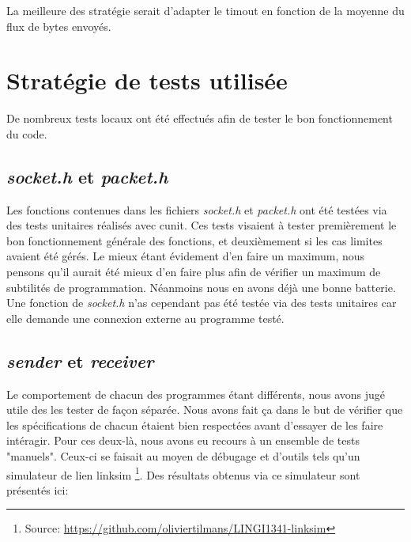 \documentclass[11pt,a4paper]{article}
\begin{document}
\vspace{3mm}

La meilleure des stratégie serait d'adapter le timout en fonction de la moyenne du flux de bytes envoyés.

\section{Stratégie de tests utilisée}
De nombreux tests locaux ont été effectués afin de tester le bon fonctionnement du code.

\subsection{\textit{socket.h} et \textit{packet.h}} Les fonctions contenues dans les fichiers \textit{socket.h} et \textit{packet.h} ont été testées via des tests unitaires réalisés avec cunit. Ces tests visaient à tester premièrement le bon fonctionnement générale des fonctions, et deuxièmement si les cas limites avaient été gérés. Le mieux étant évidement d'en faire un maximum, nous pensons qu'il aurait été mieux d'en faire plus afin de vérifier un maximum de subtilités de programmation. Néanmoins nous en avons déjà une bonne batterie. Une fonction de \textit{socket.h} n'as cependant pas été testée via des tests unitaires car elle demande une connexion externe au programme testé.

\subsection{\textit{sender} et \textit{receiver}}

 Le comportement de chacun des programmes étant différents, nous avons jugé utile des les tester de façon séparée. Nous avons fait ça dans le but de vérifier que les spécifications de chacun étaient bien respectées avant d'essayer de les faire intéragir. Pour ces deux-là, nous avons eu recours à un ensemble de tests "manuels". Ceux-ci se faisait au moyen de débugage et d'outils tels qu'un simulateur de lien linksim \footnote{Source: \url{https://github.com/oliviertilmans/LINGI1341-linksim}}. Des résultats obtenus via ce simulateur sont présentés ici:
 
\end{document}
